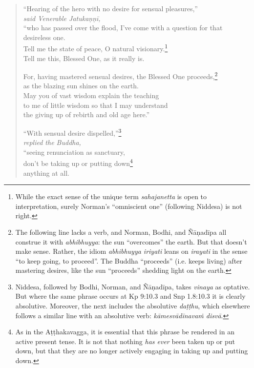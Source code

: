 \documentclass[12pt,openany]{book}%
\newcommand*{\scspeaker}[1]{\hspace{2em}\textit{#1}}
\begin{document}
\begin{verse}%
“Hearing of the hero with no desire for sensual pleasures,” \\
\scspeaker{said Venerable \textsanskrit{Jatukaṇṇī}, }\\
“who has passed over the flood, I’ve come with a question for that desireless one. \\
Tell me the state of peace, O natural visionary.\footnote{While the exact sense of the unique term \textit{sahajanetta} is open to interpretation, surely Norman’s “omniscient one” (following Niddesa) is not right. } \\
Tell me this, Blessed One, as it really is. 

For, having mastered sensual desires, the Blessed One proceeds,\footnote{The following line lacks a verb, and Norman, Bodhi, and \textsanskrit{Ñāṇadīpa} all construe it with \textit{abhibhuyya}: the sun “overcomes” the earth. But that doesn’t make sense. Rather, the idiom \textit{abhibhuyya iriyati} leans on \textit{irayati} in the sense “to keep going, to proceed”. The Buddha “proceeds” (i.e. keeps living) after mastering desires, like the sun “proceeds” shedding light on the earth. } \\
as the blazing sun shines on the earth. \\
May you of vast wisdom explain the teaching \\
to me of little wisdom so that I may understand \\
the giving up of rebirth and old age here.” 

“With sensual desire dispelled,”\footnote{Niddesa, followed by Bodhi, Norman, and \textsanskrit{Ñāṇadīpa}, takes \textit{vinaya} as optative. But where the same phrase occurs at Kp 9:10.3 and Snp 1.8:10.3 it is clearly absolutive. Moreover, the next includes the absolutive \textit{\textsanskrit{daṭṭhu}}, which elsewhere follows a similar line with an absolutive verb: \textit{\textsanskrit{kāmesvādīnavaṁ} \textsanskrit{disvā}}. } \\
\scspeaker{replied the Buddha, }\\
“seeing renunciation as sanctuary, \\
don’t be taking up or putting down\footnote{As in the \textsanskrit{Aṭṭhakavagga}, it is essential that this phrase be rendered in an active present tense. It is not that nothing \emph{has ever} been taken up or put down, but that they are no longer actively engaging in taking up and putting down. } \\
anything at all. 


\end{verse}
\end{document}
